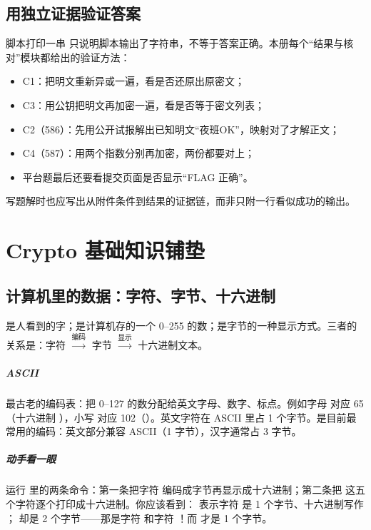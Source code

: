 \documentclass[UTF8,12pt,oneside]{ctexbook}
\begin{document}
\section{用独立证据验证答案}
脚本打印一串  只说明脚本输出了字符串，不等于答案正确。本册每个“结果与核对”模块都给出的验证方法：
\begin{itemize}
\item C1：把明文重新异或一遍，看是否还原出原密文；
\item C3：用公钥把明文再加密一遍，看是否等于密文列表；
\item C2（586）：先用公开试报解出已知明文“夜班OK”，映射对了才解正文；
\item C4（587）：用两个指数分别再加密，两份都要对上；
\item 平台题最后还要看提交页面是否显示“FLAG 正确”。
\end{itemize}
写题解时也应写出从附件条件到结果的证据链，而非只附一行看似成功的输出。

\chapter{Crypto 基础知识铺垫}

\section{计算机里的数据：字符、字节、十六进制}
是人看到的字；是计算机存的一个 0--255 的数；是字节的一种显示方式。三者的关系是：字符 $\xrightarrow{\text{编码}}$ 字节 $\xrightarrow{\text{显示}}$ 十六进制文本。

\paragraph{ASCII}最古老的编码表：把 0--127 的数分配给英文字母、数字、标点。例如字母  对应 65（十六进制 ），小写  对应 102（）。英文字符在 ASCII 里占 1 个字节。是目前最常用的编码：英文部分兼容 ASCII（1 字节），汉字通常占 3 字节。

\paragraph{动手看一眼}运行  里的两条命令：第一条把字符  编码成字节再显示成十六进制；第二条把  这五个字符逐个打印成十六进制。你应该看到： 表示字符  是 1 个字节、十六进制写作 ； 却是 2 个字节——那是字符  和字符 ！而  才是 1 个字节。
\end{document}

